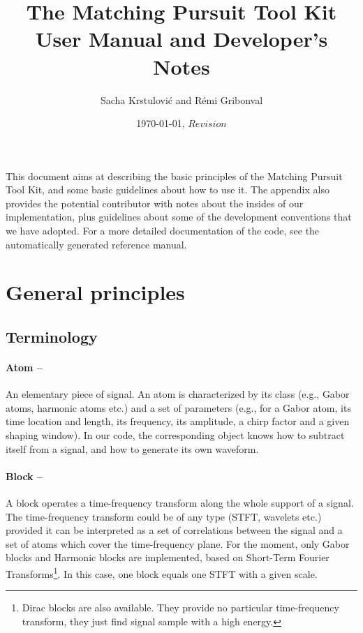 \documentclass[11pt,a4paper]{article}
\title{The Matching Pursuit Tool Kit \\ User Manual and Developer's Notes}
\author{Sacha Krstulovi\'c and R\'emi Gribonval}
\date{\today, $Revision$}
\begin{document}
\maketitle

\vfill

\tableofcontents

\vfill

\clearpage

\noindent This document aims at describing the basic principles of the Matching
Pursuit Tool Kit, and some basic guidelines about how to use it.  The appendix
also provides the potential contributor with notes about the insides of our
implementation, plus guidelines about some of the development conventions that
we have adopted. For a more detailed documentation of the code, see the
automatically generated reference manual.

\section{General principles \label{gen}}

\subsection{Terminology \label{term}}
\paragraph{Atom --} An elementary piece of signal. An atom is characterized by
its class (e.g., Gabor atoms, harmonic atoms etc.) and a set of parameters
(e.g., for a Gabor atom, its time location and length, its frequency, its
amplitude, a chirp factor and a given shaping window). In our code, the
corresponding object knows how to subtract itself from a signal, and how to
generate its own waveform.

\paragraph{Block --} A block operates a time-frequency transform
along the whole support of a signal. The time-frequency transform could be of
any type (STFT, wavelets etc.) provided it can be interpreted as a set of
correlations between the signal and a set of atoms which cover the
time-frequency plane. For the moment, only Gabor blocks and Harmonic blocks are
implemented, based on Short-Term Fourier Transforms\footnote{Dirac blocks are
  also available. They provide no particular time-frequency transform, they
  just find signal sample with a high energy.}. In this case, one block equals
one STFT with a given scale.
\end{document}
